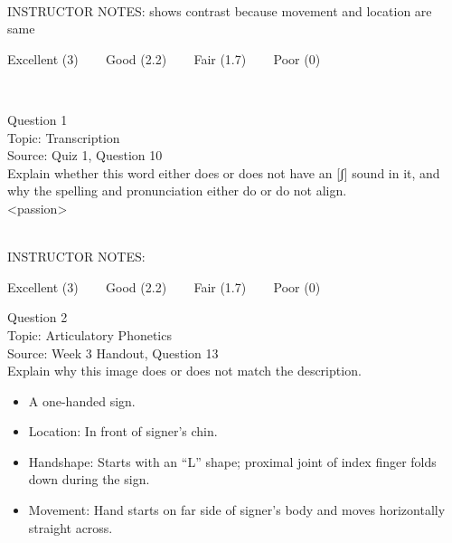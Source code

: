 \documentclass[12pt]{article}
\begin{document}
~\\
INSTRUCTOR NOTES: shows contrast because movement and location are same


\vfill
Excellent (3) ~~~ Good (2.2) ~~~ Fair (1.7) ~~~ Poor (0)
\newpage

\begin{center}
\textbf{{\color{red}{\HUGE END OF EXAM}}}\\

\end{center}
\newpage

\begin{center}
\textbf{{\color{blue}{\HUGE START OF EXAM\\}}}

\textbf{{\color{blue}{\HUGE Student ID: 94549\\}}}

\textbf{{\color{blue}{\HUGE \\}}}

\end{center}
\newpage

{\large Question 1}\\

Topic: Transcription\\
Source: Quiz 1, Question 10\\

Explain whether this word either does or does not have an [ʃ] sound in it, and why the spelling and pronunciation either do or do not align.\\

<passion>


~\\
INSTRUCTOR NOTES: 


\vfill
Excellent (3) ~~~ Good (2.2) ~~~ Fair (1.7) ~~~ Poor (0)
\newpage

{\large Question 2}\\

Topic: Articulatory Phonetics\\
Source: Week 3 Handout, Question 13\\

Explain why this image does or does not match the description.\\

\begin{itemize} \item A one-handed sign. \item Location: In front of signer’s chin. \item Handshape: Starts with an “L” shape; proximal joint of index finger folds down during the sign. \item Movement: Hand starts on far side of signer’s body and moves horizontally straight across. \end{itemize}
\end{document}
